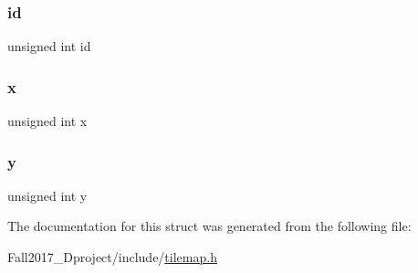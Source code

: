 \mbox{\label{structtile__s_ab7ce6f462afaf105224b0ca772a33c43}} 
\subsubsection{\texorpdfstring{id}{id}}
{\footnotesize\ttfamily unsigned int id}

\mbox{\label{structtile__s_a676e0da0ef83bbbdf42538e54b97506b}} 
\subsubsection{\texorpdfstring{x}{x}}
{\footnotesize\ttfamily unsigned int x}

\mbox{\label{structtile__s_ac30de26db5f6d1c18c63913729adca7d}} 
\subsubsection{\texorpdfstring{y}{y}}
{\footnotesize\ttfamily unsigned int y}



The documentation for this struct was generated from the following file\+:\begin{DoxyCompactItemize}
\item 
Fall2017\+\_\+Dproject/include/\hyperlink{tilemap_8h}{tilemap.\+h}\end{DoxyCompactItemize}
